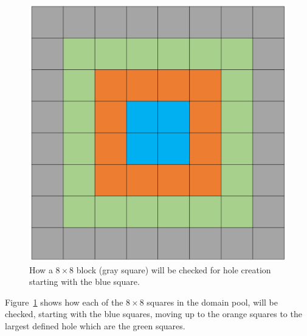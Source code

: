\documentclass[10pt,twocolumn, a4paper]{witseiepaper}
\begin{document}
\begin{figure}[h!]
\renewcommand{\thefigure}{\arabic{figure}}
\centering
\includegraphics[scale=0.2]{Grid.png}
\caption{How a $8\times 8$ block (gray square) will be checked for hole creation starting with the blue square.}
\label{fig: Grid}
\end{figure}

Figure~\ref{fig: Grid} shows how each of the $8\times 8$ squares in the domain pool, will be checked, starting with the blue squares, moving up to the orange squares to the largest defined hole which are the green squares.
\end{document}
